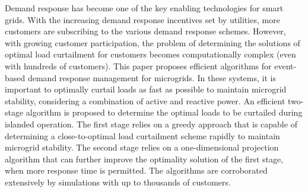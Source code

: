 Demand response has become one of the key enabling technologies for smart grids. With the increasing demand response incentives set by utilities, more customers are subscribing to the various demand response schemes. However, with growing customer participation, the problem of determining the solutions of optimal load curtailment for customers becomes computationally complex (even with hundreds of customers). This paper proposes efficient algorithms for event-based demand response management for microgrids. In these systems, it is important to optimally curtail loads as fast as possible to maintain microgrid stability, considering a combination of active and reactive power. An efficient two-stage algorithm is proposed to determine the optimal loads to be curtailed during islanded operation. The first stage relies on a greedy approach that is capable of determining a close-to-optimal load curtailment scheme rapidly to maintain microgrid stability. The second stage relies on a one-dimensional projection algorithm that can further improve the optimality solution of the first stage, when more response time is permitted. The algorithms are corroborated extensively by simulations with up to thousands of customers.
